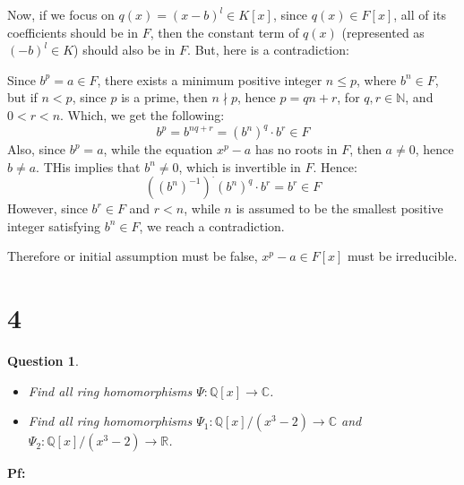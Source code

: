 \documentclass{article}
\newtheorem{question}{Question}
\begin{document}
\hfil

Now, if we focus on $q(x)=(x-b)^l\in K[x]$, since $q(x)\in F[x]$, all of its coefficients should be in $F$, then the constant term of $q(x)$ (represented as $(-b)^l\in K$) should also be in $F$. But, here is a contradiction:

Since $b^p=a\in F$, there exists a minimum positive integer $n\leq p$, where $b^n\in F$, but if $n<p$, since $p$ is a prime, then $n\nmid p$, hence $p=qn+r$, for $q,r\in \mathbb{N}$, and $0<r<n$.
Which, we get the following:
$$b^p=b^{nq+r}=(b^n)^q\cdot b^r \in F$$
Also, since $b^p=a$, while the equation $x^p-a$ has no roots in $F$, then $a\neq 0$, hence $b\neq a$. THis implies that $b^n \neq 0$, which is invertible in $F$. Hence:
$$((b^n)^{-1})^\cdot(b^n)^q\cdot b^r=b^r\in F$$
However, since $b^r\in F$ and $r<n$, while $n$ is assumed to be the smallest positive integer satisfying $b^n\in F$, we reach a contradiction.

Therefore or initial assumption must be false, $x^p-a\in F[x]$ must be irreducible.



\break

\section*{4}
\begin{myBox}[]{}
    \begin{question}

        \hfil

        \begin{itemize}
            \item[(a)] Find all ring homomorphisms $\Psi:\mathbb{Q}[x]\rightarrow \mathbb{C}$.
            \item[(b)] Find all ring homomorphisms $\Psi_1:\mathbb{Q}[x]/(x^3-2)\rightarrow\mathbb{C}$ and $\Psi_2:\mathbb{Q}[x]/(x^3-2)\rightarrow\mathbb{R}$.
        \end{itemize}
    \end{question}
\end{myBox}

\textbf{Pf:}
\end{document}
